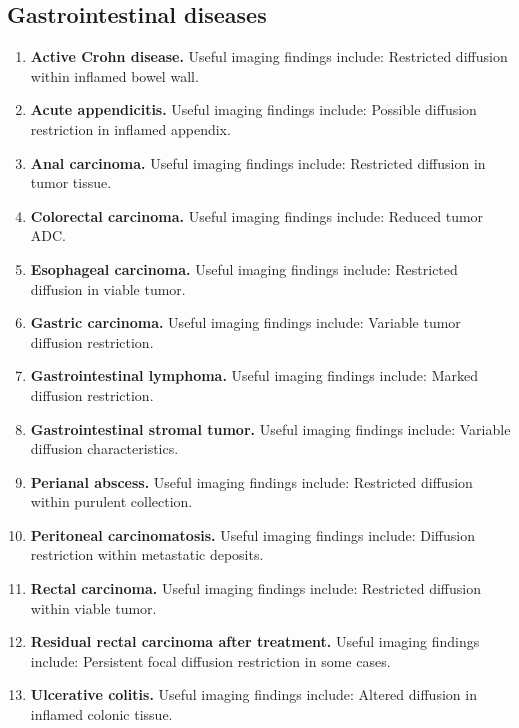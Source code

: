 \subsection{Gastrointestinal diseases}
\begin{enumerate}[leftmargin=*,itemsep=0.45em,topsep=0.4em]
\item \textbf{Active Crohn disease.} Useful imaging findings include: Restricted diffusion within inflamed bowel wall.
\item \textbf{Acute appendicitis.} Useful imaging findings include: Possible diffusion restriction in inflamed appendix.
\item \textbf{Anal carcinoma.} Useful imaging findings include: Restricted diffusion in tumor tissue.
\item \textbf{Colorectal carcinoma.} Useful imaging findings include: Reduced tumor ADC.
\item \textbf{Esophageal carcinoma.} Useful imaging findings include: Restricted diffusion in viable tumor.
\item \textbf{Gastric carcinoma.} Useful imaging findings include: Variable tumor diffusion restriction.
\item \textbf{Gastrointestinal lymphoma.} Useful imaging findings include: Marked diffusion restriction.
\item \textbf{Gastrointestinal stromal tumor.} Useful imaging findings include: Variable diffusion characteristics.
\item \textbf{Perianal abscess.} Useful imaging findings include: Restricted diffusion within purulent collection.
\item \textbf{Peritoneal carcinomatosis.} Useful imaging findings include: Diffusion restriction within metastatic deposits.
\item \textbf{Rectal carcinoma.} Useful imaging findings include: Restricted diffusion within viable tumor.
\item \textbf{Residual rectal carcinoma after treatment.} Useful imaging findings include: Persistent focal diffusion restriction in some cases.
\item \textbf{Ulcerative colitis.} Useful imaging findings include: Altered diffusion in inflamed colonic tissue.
\end{enumerate}

